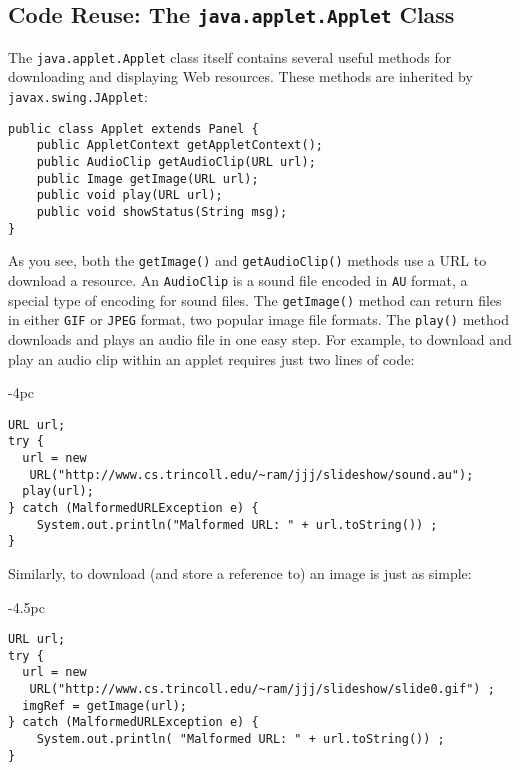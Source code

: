\subsection{Code Reuse: The {\tt java.applet.Applet} Class}
\noindent The {\tt java.applet.Applet} class itself contains several useful
methods for downloading and displaying Web resources.  These
methods are inherited by {\tt javax.swing.JApplet}:

\begin{jjjlisting}
\begin{lstlisting}
public class Applet extends Panel {
    public AppletContext getAppletContext();
    public AudioClip getAudioClip(URL url);
    public Image getImage(URL url);
    public void play(URL url);
    public void showStatus(String msg);
}
\end{lstlisting}
\end{jjjlisting}

\noindent As you see, both the {\tt getImage()} and {\tt getAudioClip()}
methods use a URL to download a resource.   An {\tt AudioClip} is a
sound file encoded in {\tt AU} format, a special type of encoding for
sound files.  The {\tt getImage()} method can return files in either
{\tt GIF} or {\tt JPEG} format, two popular image file formats.  The
{\tt play()} method downloads and plays an audio file in
one easy step.  For example, to download and play an audio clip within
an applet requires just two lines of code:

\begin{jjjlistingleft}[30pc]{-4pc}
\begin{lstlisting}
URL url;
try {
  url = new 
   URL("http://www.cs.trincoll.edu/~ram/jjj/slideshow/sound.au");
  play(url);
} catch (MalformedURLException e) {
    System.out.println("Malformed URL: " + url.toString()) ;
}
\end{lstlisting}
\end{jjjlistingleft}

\noindent Similarly, to download (and store a reference to)
an image is just as simple:

\begin{jjjlistingleft}[30.5pc]{-4.5pc}
\begin{lstlisting}
URL url;
try {
  url = new 
   URL("http://www.cs.trincoll.edu/~ram/jjj/slideshow/slide0.gif") ;
  imgRef = getImage(url);
} catch (MalformedURLException e) {
    System.out.println( "Malformed URL: " + url.toString()) ;
}
\end{lstlisting}
\end{jjjlistingleft}

